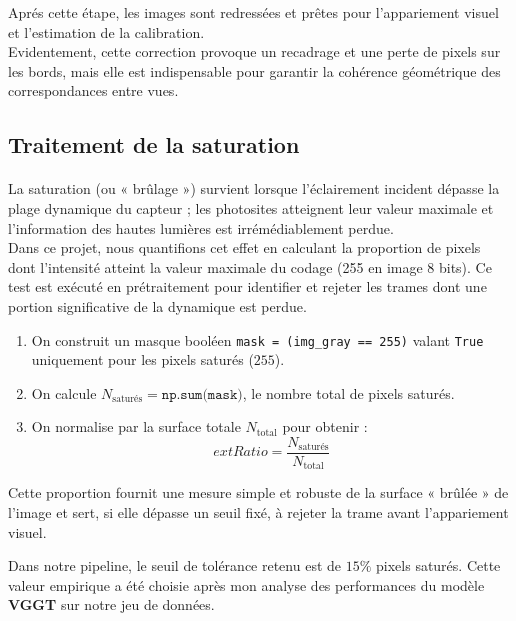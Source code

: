 \documentclass[12pt,a4paper,oneside]{report}
\begin{document}
\hspace*{.5cm} Aprés cette étape, les images sont redressées et prêtes pour l'appariement visuel et l'estimation de la calibration. \\
Evidentement, cette correction provoque un recadrage et une perte de pixels sur les bords, mais elle est indispensable pour garantir la cohérence géométrique des correspondances entre vues.

\newpage

\subsection{Traitement de la saturation}
\paragraph{}
La saturation (ou « brûlage ») survient lorsque l'éclairement incident dépasse la plage dynamique du capteur ; les photosites atteignent leur valeur maximale et l'information des hautes lumières est irrémédiablement perdue. \\

\hspace*{.5cm} Dans ce projet, nous quantifions cet effet en calculant la proportion de pixels dont l'intensité atteint la valeur maximale du codage (255 en image 8 bits). Ce test est exécuté en prétraitement pour identifier et rejeter les trames dont une portion significative de la dynamique est perdue.\\

\begin{enumerate}[label=\arabic*)]
    \item On construit un masque bool\'een \texttt{mask = (img\_gray == 255)} valant \texttt{True} uniquement pour les pixels satur\'es ($255$).
    \item On calcule $N_{\text{satur\'es}} = \texttt{np.sum(mask)}$, le nombre total de pixels satur\'es.
    \item On normalise par la surface totale $N_{\text{total}}$ pour obtenir :
    \[
    	ext{Ratio} = \frac{N_{\text{satur\'es}}}{N_{\text{total}}}
    \]
\end{enumerate}

\hspace*{.5cm} Cette proportion fournit une mesure simple et robuste de la surface « brûlée » de l'image et sert, si elle dépasse un seuil fixé, à rejeter la trame avant l'appariement visuel.

\hspace*{.5cm} Dans notre pipeline, le seuil de tolérance retenu est de $15\%$ pixels saturés. Cette valeur empirique a été choisie après mon analyse des performances du modèle \textbf{VGGT} sur notre jeu de données.\\
\end{document}
